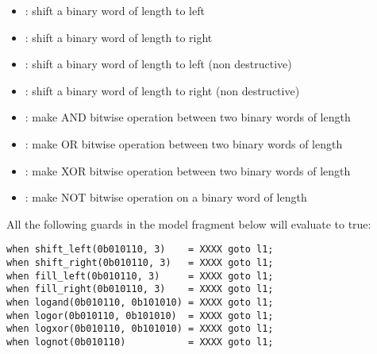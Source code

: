 \begin{itemize}
    \item {}: shift a binary word of length  to left
		\item {}: shift a binary word of length  to right
		\item {}: shift a binary word of length  to left (non destructive)
		\item {}: shift a binary word of length  to right (non destructive)
		\item {}: make AND bitwise operation between two binary words of length 
		\item {}: make OR bitwise operation between two binary words of length 
		\item {}: make XOR bitwise operation between two binary words of length 
		\item {}: make NOT bitwise operation on a binary word of length 
\end{itemize}

\begin{example}
	All the following guards in the model fragment below will evaluate to true:
	
\begin{lstlisting}[style=IMITATORmodel,numbers=none]
when shift_left(0b010110, 3)    = XXXX goto l1;
when shift_right(0b010110, 3)   = XXXX goto l1;
when fill_left(0b010110, 3)     = XXXX goto l1;
when fill_right(0b010110, 3)    = XXXX goto l1;
when logand(0b010110, 0b101010) = XXXX goto l1;
when logor(0b010110, 0b101010)  = XXXX goto l1;
when logxor(0b010110, 0b101010) = XXXX goto l1;
when lognot(0b010110)           = XXXX goto l1;
\end{lstlisting}

\end{example}


